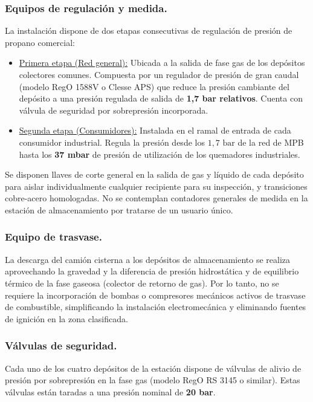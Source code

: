 \documentclass[12pt]{article}
\begin{document}
            \subsubsection{Equipos de regulación y medida.}
            La instalación dispone de dos etapas consecutivas de regulación de presión de propano comercial:
            \begin{itemize}
                \item \underline{Primera etapa (Red general):} Ubicada a la salida de fase gas de los depósitos colectores comunes. Compuesta por un regulador de presión de gran caudal (modelo RegO 1588V o Clesse APS) que reduce la presión cambiante del depósito a una presión regulada de salida de \textbf{1,7 bar relativos}. Cuenta con válvula de seguridad por sobrepresión incorporada.
                \item \underline{Segunda etapa (Consumidores):} Instalada en el ramal de entrada de cada consumidor industrial. Regula la presión desde los $1,7\text{ bar}$ de la red de MPB hasta los \textbf{37 mbar} de presión de utilización de los quemadores industriales.
            \end{itemize}
            Se disponen llaves de corte general en la salida de gas y líquido de cada depósito para aislar individualmente cualquier recipiente para su inspección, y transiciones cobre-acero homologadas. No se contemplan contadores generales de medida en la estación de almacenamiento por tratarse de un usuario único.

            \subsubsection{Equipo de trasvase.}
            La descarga del camión cisterna a los depósitos de almacenamiento se realiza aprovechando la gravedad y la diferencia de presión hidrostática y de equilibrio térmico de la fase gaseosa (colector de retorno de gas). Por lo tanto, no se requiere la incorporación de bombas o compresores mecánicos activos de trasvase de combustible, simplificando la instalación electromecánica y eliminando fuentes de ignición en la zona clasificada.

            \subsubsection{Válvulas de seguridad.}
            Cada uno de los cuatro depósitos de la estación dispone de válvulas de alivio de presión por sobrepresión en la fase gas (modelo RegO RS 3145 o similar). Estas válvulas están taradas a una presión nominal de \textbf{20 bar}.
            
\end{document}
